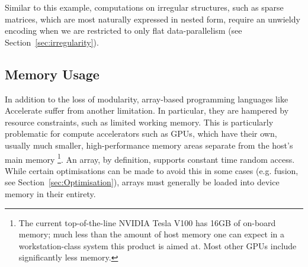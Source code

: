 Similar to this example, computations on irregular structures, such as sparse matrices, which are most naturally expressed in nested form, require an unwieldy encoding when we are restricted to only flat data-parallelism (see Section~\ref{sec:irregularity}).




%
%
%

\subsection{Memory Usage}
\label{sec:problem_2}

In addition to the loss of modularity, array-based programming languages like Accelerate suffer from another limitation. In particular, they are hampered by resource constraints, such as limited working memory. This is particularly problematic for compute accelerators such as GPUs, which have their own, usually much smaller, high-performance memory areas separate from the host's main memory%
\footnote{The current top-of-the-line NVIDIA Tesla V100 has 16GB of on-board
memory; much less than the amount of host memory one can expect in a
workstation-class system this product is aimed at. Most other GPUs include significantly less memory.}.
An array, by definition, supports constant time random access. While certain optimisations can be made to avoid this in some cases (e.g. fusion, see Section~\ref{sec:Optimisation}), arrays must generally be loaded into device memory in their entirety.

